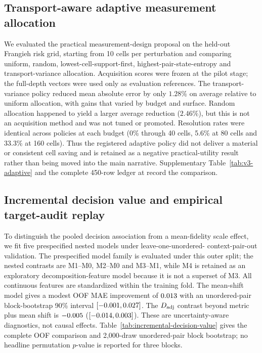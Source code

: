 \documentclass{article}
\begin{document}


\subsection{Transport-aware adaptive measurement allocation}
\label{app:adaptive}

We evaluated the practical measurement-design proposal on the held-out
Frangieh risk grid, starting from 10 cells per perturbation and comparing
uniform, random, lowest-cell-support-first, highest-pair-state-entropy and
transport-variance allocation. Acquisition scores were frozen at the pilot
stage; the full-depth vectors were used only as evaluation references. The
transport-variance policy reduced mean absolute error by only $1.28\%$ on
average relative to uniform allocation, with gains that varied by budget and
surface. Random allocation happened to yield a larger average reduction
($2.46\%$), but this is not an acquisition method and was not tuned or
promoted. Resolution rates were identical across policies at each budget
(0\% through 40 cells, 5.6\% at 80 cells and 33.3\% at 160 cells). Thus the
registered adaptive policy did not deliver a material or consistent cell
saving and is retained as a negative practical-utility result rather than
being moved into the main narrative. Supplementary Table~\ref{tab:v3-adaptive}
and the complete 450-row ledger at
record the comparison.



\subsection{Incremental decision value and empirical target-audit replay}

To distinguish the pooled decision association from a mean-fidelity scale
effect, we fit five prespecified nested models under leave-one-unordered-
context-pair-out
validation. The prespecified model family is evaluated under this outer split;
the nested contrasts are M1--M0, M2--M0 and M3--M1, while M4 is retained as an
exploratory decomposition-feature model because it is not a superset of M3.
All continuous features are standardized within the training fold.
The mean-shift model gives a modest OOF MAE improvement of
$0.013$ with an unordered-pair block-bootstrap 90\% interval
$[-0.001, 0.027]$. The $D_{\rm adj}$ contrast beyond metric plus
mean shift is $-0.005$
($[-0.014, 0.003]$). These are uncertainty-aware
diagnostics, not causal effects. Table~\ref{tab:incremental-decision-value}
gives the complete OOF comparison and 2,000-draw unordered-pair block
bootstrap; no headline permutation $p$-value is reported for three blocks.
\end{document}
